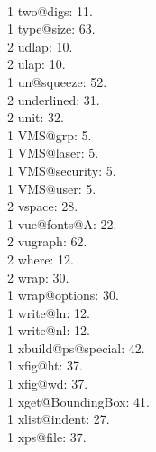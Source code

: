 \\1 two@digs: 11.
\\1 type@size: 63.
\\2 udlap: 10.
\\2 ulap: 10.
\\1 un@squeeze: 52.
\\2 underlined: 31.
\\2 unit: 32.
\\1 VMS@grp: 5.
\\1 VMS@laser: 5.
\\1 VMS@security: 5.
\\1 VMS@user: 5.
\\2 vspace: 28.
\\1 vue@fonts@A: 22.
\\2 vugraph: 62.
\\2 where: 12.
\\2 wrap: 30.
\\1 wrap@options: 30.
\\1 write@ln: 12.
\\1 write@nl: 12.
\\1 xbuild@ps@special: 42.
\\1 xfig@ht: 37.
\\1 xfig@wd: 37.
\\1 xget@BoundingBox: 41.
\\1 xlist@indent: 27.
\\1 xps@file: 37.

